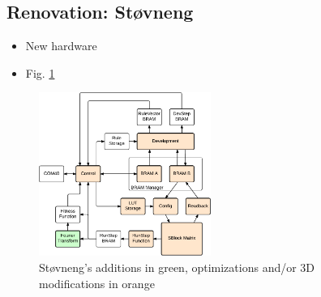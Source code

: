 \subsection{Renovation: Støvneng \cite{stovneng2014sblock}}

\begin{itemize}
    \item New hardware
    \item Fig. \ref{fig:overview-stovneng}
\end{itemize}

\begin{figure}[!ht]
    \centering
    \includegraphics[width=0.5\textwidth]{figures/overview-stovneng}
    \caption{Støvneng's additions in green, optimizations and/or 3D modifications in orange}
    \label{fig:overview-stovneng}
\end{figure}

